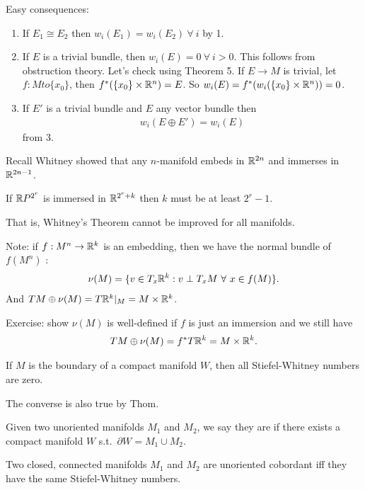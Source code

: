 \documentclass[12pt,class=article,crop=false]{standalone}
\begin{document}
Easy consequences:
\begin{enumerate}[label=(\arabic*)]
	\item If $ E_1 \cong E_2$ then $ w_i(E_1) = w_i(E_2) \ \forall \ i$ by 1.
	\item If $ E$ is a trivial bundle, then  $ w_i(E) = 0 \ \forall \ i>0$. This follows from obstruction theory. Let's check using Theorem 5. 
		If $ E \to M$ is trivial, let $ f: M to \{x_0\} $, then $ f^* (\{x_0\} \times \mathbb{R}^{n}) = E$. So $ w_i(E) = f^* (w_i(\{x_0\} \times \mathbb{R}^{n} )) = 0$.
	\item If $ E'$ is a trivial bundle and  $ E$ any vector bundle then
		 \begin{align*}
			w_i(E \oplus E') = w_i(E)
		\end{align*}
		from 3.
\end{enumerate}
Recall Whitney showed that any $ n$-manifold embeds in  $ \mathbb{R}^{2n}$ and immerses in $ \mathbb{R}^{2n-1}$.
\begin{thm}
If $ \mathbb{R} P^{2^{r}}$ is immersed in $ \mathbb{R}^{2^{r}+k}$ then $ k$ must be at least  $ 2^{r}-1$.
\end{thm}
That is, Whitney's Theorem cannot be improved for all manifolds.

Note: if $ f: M^{n} \to \mathbb{R}^{k}$ is an embedding, then we have the normal bundle of $ f(M^{n})$ :
\begin{align*}
	\nu(M) = \{v \in T_x \mathbb{R}^{k}: v \perp T_x M \ \forall \ x \in f(M)\} .
\end{align*}
And $ TM \oplus \nu(M) = T\mathbb{R}^{k}|_M = M \times \mathbb{R}^{k}$.

Exercise: show $ \nu(M)$ is well-defined if $ f$ is just an immersion and we still have
 \begin{align*}
	TM \oplus \nu(M) = f^* T\mathbb{R}^{k} = M \times \mathbb{R}^{k}.
\end{align*}

\begin{thm}
If $ M$ is the boundary of a compact manifold  $ W$, then all Stiefel-Whitney numbers are zero.
\end{thm}

\begin{remark}
The converse is also true by Thom.
\end{remark}

\begin{defn}
Given two unoriented manifolds $ M_1$ and $ M_2$, we say they are  if there exists a compact manifold $ W$  s.t.\ $ \partial W = M_1 \cup M_2$. 
\end{defn}

\begin{coro}
Two closed, connected manifolds $ M_1$ and $ M_2$ are unoriented cobordant iff they have the same Stiefel-Whitney numbers. 
\end{coro}
\end{document}
